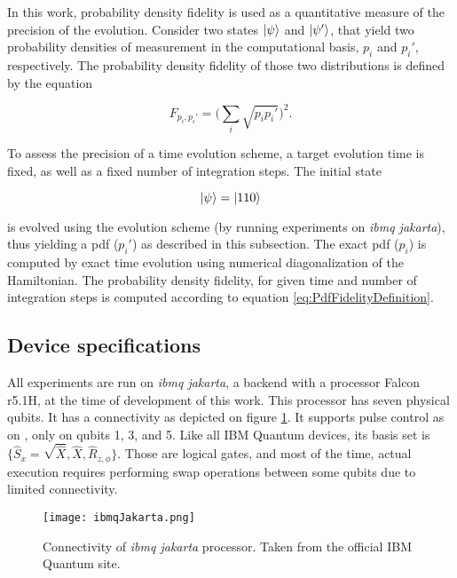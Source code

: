       In this work, probability density fidelity is used as a quantitative measure of the precision of the evolution. Consider two states $\ket{\psi}$ and $\ket{\psi'}$, that yield two probability densities of measurement in the computational basis, $p_i$ and $p_i'$, respectively. The probability density fidelity of those two distributions is defined \cite{HubbardSimulLasHeras} by the equation

      \begin{equation}
        F_{p_i, p_i'} = \big(\sum_i \sqrt{p_i p_i'}\big)^2.
        \label{eq:PdfFidelityDefinition}
      \end{equation}

      To assess the precision of a time evolution scheme, a target evolution time is fixed, as well as a fixed number of integration steps. The initial state

      \begin{equation}
        \ket{\psi} = \ket{110}
        \label{eq:initialStateBenchmark}
      \end{equation}

      \noindent is evolved using the evolution scheme (by running experiments on \textit{ibmq jakarta}), thus yielding a pdf ($p_i'$) as described in this subsection. The exact pdf ($p_i$) is computed by exact time evolution using numerical diagonalization of the Hamiltonian. The probability density fidelity, for given time and number of integration steps is computed according to equation \ref{eq:PdfFidelityDefinition}.

  \subsection{Device specifications}
  \label{subsec:ibmq_jakartaSpecs}

    All experiments are run on \textit{ibmq jakarta}, a backend with a processor Falcon r5.1H, at the time of development of this work. This processor has seven physical qubits. It has a connectivity as depicted on figure \ref{fig:JakartaConnectivity}. It supports pulse control as on \cite{RXZPulseEfficient}, only on qubits 1, 3, and 5. Like all IBM Quantum devices, its basis set is $\{\hat{S}_x = \sqrt{\hat{X}}, \hat{X}, \hat{R}_{z,\phi} \}$. Those are logical gates, and most of the time, actual execution requires performing swap operations between some qubits due to limited connectivity.

    \begin{figure}
      \centering
      \texttt{[image: ibmqJakarta.png]}
      \caption{Connectivity of \textit{ibmq jakarta} processor. Taken from the official IBM Quantum site.}
      \label{fig:JakartaConnectivity}
    \end{figure}

